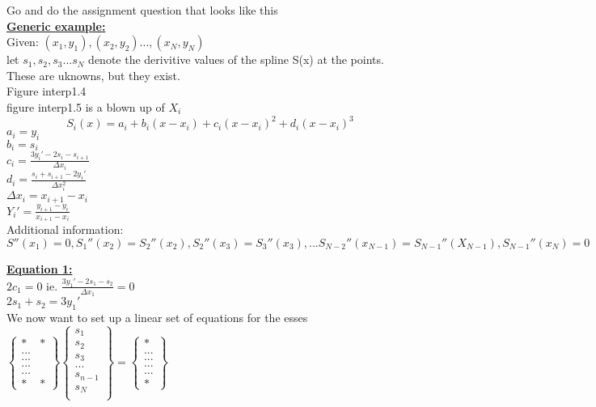 \documentclass[12pt]{article}
\newcommand{\myt}[1]{\textbf{\underline{#1}}}
\begin{document}
	Go and do the assignment question that looks like this\\
	
	\myt{Generic example:}\\
	Given: $(x_1, y_1), (x_2,y_2)..., (x_N, y_N)$\\
	let $s_1, s_2, s_3 ... s_N$ denote the derivitive values of the spline S(x) at the points. These are uknowns, but they exist.\\
	Figure interp1.4\\
	figure interp1.5 is a blown up of $X_i$\\
	
	$$S_i(x) = a_i + b_i(x-x_i) + c_i(x-x_i)^2 + d_i(x-x_i)^3$$
	$a_i = y_i$\\
	$b_i = s_i$\\
	$c_i = \frac{3y_i' - 2s_i - s_{i+1}}{\Delta x_i}$\\
	$d_i = \frac{s_i + s_{i+1} - 2y_i'}{\Delta x_i^2}$\\
	$\Delta x_i = x_{i+1} - x_i$\\
	$Y_i' = \frac{y_{i+1} - y_i}{x_{i+1}-x_i}$\\
	
	Additional information:\\
	$$S''(x_1) = 0, S_1''(x_2) = S_2''(x_2), S_2''(x_3) = S_3''(x_3), ... S_{N-2}''(x_{N-1}) = S_{N-1}''(X_{N-1}), S_{N-1}''(x_N) = 0$$
	
	\myt{Equation 1:}\\
	$2c_1 = 0$ ie. $\frac{3y_1' - 2s_1 - s_2}{\Delta x_1} = 0$\\
	$2s_1 + s_2 = 3y_1'$\\
	
	We now want to set up a linear set of equations for the esses\\
	
	$
	\begin{Bmatrix}
	* & * \\
	... \\
	... \\
	... \\
	... \\
	* & *
	\end{Bmatrix}
	\begin{Bmatrix}
	s_1 \\
	s_2 \\
	s_3 \\
	... \\
	s_{n-1}\\
	s_N\\
	\end{Bmatrix}
	=
	\begin{Bmatrix}
	*  \\
	... \\
	... \\
	... \\
	... \\
	*
	\end{Bmatrix}
	$
	
\end{document}
